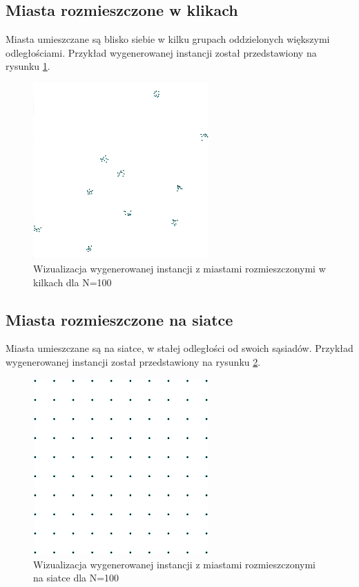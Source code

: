 \subsection*{Miasta rozmieszczone w klikach}
Miasta umieszczane są blisko siebie w kilku grupach oddzielonych większymi odległościami.
Przykład wygenerowanej instancji został przedstawiony na rysunku \ref{fig:clique_example}.
\begin{figure}[h!]
    \centering
    \includegraphics[width=0.60\textwidth]{chapters/experiments/img/clique_example.png}
    \caption{Wizualizacja wygenerowanej instancji z miastami rozmieszczonymi w kilkach dla N=100}
    \label{fig:clique_example}
\end{figure}

\subsection*{Miasta rozmieszczone na siatce}
Miasta umieszczane są na siatce, w stałej odległości od swoich sąsiadów.
Przykład wygenerowanej instancji został przedstawiony na rysunku \ref{fig:grid_example}.
\begin{figure}[h!]
    \centering
    \includegraphics[width=0.60\textwidth]{chapters/experiments/img/grid_example.png}
    \caption{Wizualizacja wygenerowanej instancji z miastami rozmieszczonymi na siatce dla N=100}
    \label{fig:grid_example}
\end{figure}


